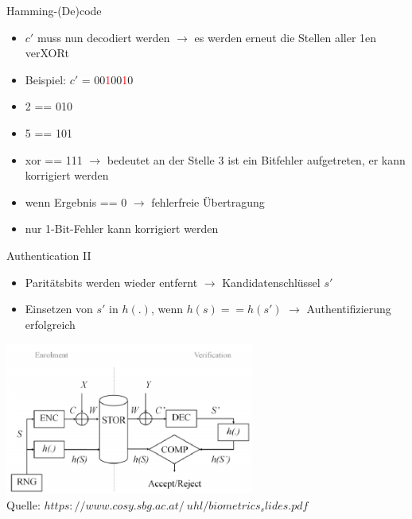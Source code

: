 \documentclass{beamer}
\begin{document}
\begin{frame}{Hamming-(De)code}
	\begin{itemize}
		\item $c'$ muss nun decodiert werden $\rightarrow$ es werden erneut die Stellen aller 1en verXORt
		\item Beispiel: $c'$ = 00\textcolor{red}{1}00\textcolor{red}{1}0
		\item 2 == 010
		\item 5 == 101
		\item xor == 111 $\rightarrow$ bedeutet an der Stelle 3 ist ein Bitfehler aufgetreten, er kann korrigiert werden
		\item wenn Ergebnis == 0 $\rightarrow$ fehlerfreie Übertragung
		\item nur 1-Bit-Fehler kann korrigiert werden
	\end{itemize}
\end{frame}
\begin{frame}{Authentication II}
	\begin{itemize}
		\item Parit\"atsbits werden wieder entfernt $\rightarrow$ Kandidatenschl\"ussel $s'$
		\item Einsetzen von $s'$ in $h(.)$, wenn $h(s) == h(s')$ $\rightarrow$ Authentifizierung erfolgreich
	\end{itemize}
	\hspace{10mm}\includegraphics[height=5cm]{fcs.png}\\
	\tiny{Quelle: \textit{\tiny{$https://www.cosy.sbg.ac.at/~uhl/biometrics_slides.pdf$}}}
\end{frame}
\end{document}
